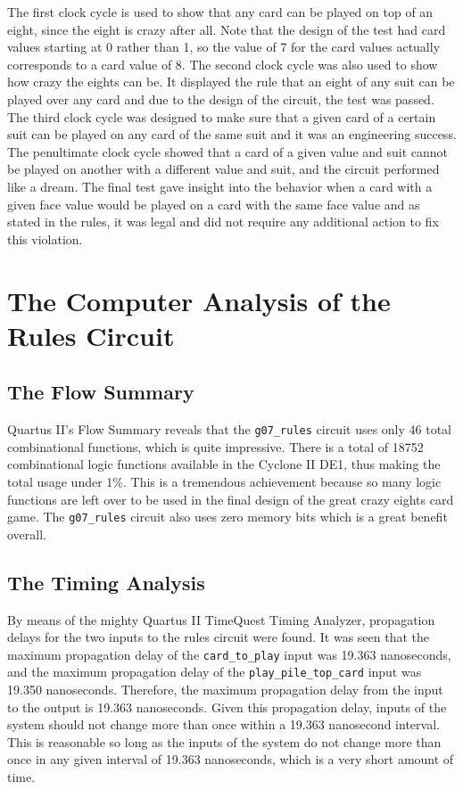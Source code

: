 \documentclass[12pt]{report}
\begin{document}
The first clock cycle is used to show that any card can be played on top of an eight, since the
eight is crazy after all. Note that the design of
the test had card values starting at 0 rather than 1, so the value of 7 for the card values actually
corresponds to a card value of 8. The second clock cycle was also used to show how crazy the eights
can be. It displayed the rule that an eight of any suit can be played over any card and due to the
design of the circuit, the test was passed. The third clock cycle was designed to make sure that a
given card of a certain suit can be played on any card of the same suit and it was an engineering
success. The penultimate clock cycle showed that a card of a given value and suit cannot be played
on another with a different value and suit, and the circuit performed like a dream. The final test
gave insight into the behavior when a card with a given face value would be played on a card with
the same face value and as stated in the rules, it was legal and did not require any additional
action to fix this violation. 

\chapter*{The Computer Analysis of the Rules Circuit}
\section*{The Flow Summary}
Quartus II’s Flow Summary reveals that the \texttt{g07\_rules} circuit uses only 46 total
combinational functions, which is quite impressive. There is a total of 18752 combinational logic
functions available in the Cyclone II DE1, thus making the total usage under 1\%. This is a
tremendous achievement because so many logic functions are left over to be used in the final design
of the great crazy eights card game. The \texttt{g07\_rules} circuit also uses zero memory bits
which is a great benefit overall. 

\section*{The Timing Analysis}
By means of the mighty Quartus II TimeQuest Timing Analyzer, propagation delays for the two inputs
to the rules circuit were found. It was seen that the maximum propagation delay of the
\texttt{card\_to\_play} input was 19.363 nanoseconds, and the maximum propagation delay of the
\texttt{play\_pile\_top\_card} input was 19.350 nanoseconds. Therefore, the maximum propagation
delay from the input to the output is 19.363 nanoseconds. Given this propagation delay, inputs of
the system should not change more than once within a 19.363 nanosecond interval. This is reasonable
so long as the inputs of the system do not change more than once in any given interval of 19.363
nanoseconds, which is a very short amount of time.
\end{document}
